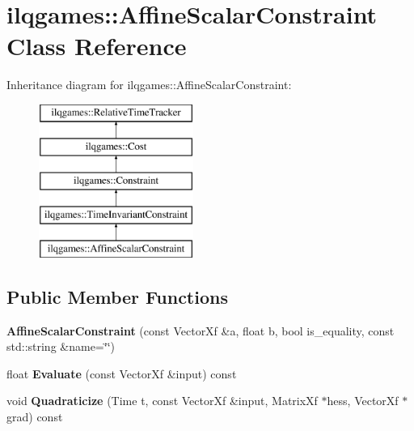 \hypertarget{classilqgames_1_1_affine_scalar_constraint}{}\section{ilqgames\+:\+:Affine\+Scalar\+Constraint Class Reference}
\label{classilqgames_1_1_affine_scalar_constraint}
Inheritance diagram for ilqgames\+:\+:Affine\+Scalar\+Constraint\+:\begin{figure}[H]
\begin{center}
\leavevmode
\includegraphics[height=5.000000cm]{classilqgames_1_1_affine_scalar_constraint}
\end{center}
\end{figure}
\subsection*{Public Member Functions}
\begin{DoxyCompactItemize}
\item 
{\bfseries Affine\+Scalar\+Constraint} (const Vector\+Xf \&a, float b, bool is\+\_\+equality, const std\+::string \&name=\char`\"{}\char`\"{})\hypertarget{classilqgames_1_1_affine_scalar_constraint_a450104ec20d507b10b9fff59b25a0120}{}\label{classilqgames_1_1_affine_scalar_constraint_a450104ec20d507b10b9fff59b25a0120}

\item 
float {\bfseries Evaluate} (const Vector\+Xf \&input) const \hypertarget{classilqgames_1_1_affine_scalar_constraint_af185f41cac2b73aa69145bcd1f1deaee}{}\label{classilqgames_1_1_affine_scalar_constraint_af185f41cac2b73aa69145bcd1f1deaee}

\item 
void {\bfseries Quadraticize} (Time t, const Vector\+Xf \&input, Matrix\+Xf $\ast$hess, Vector\+Xf $\ast$grad) const \hypertarget{classilqgames_1_1_affine_scalar_constraint_a985426b4931ec298b7c281611fa125f0}{}\label{classilqgames_1_1_affine_scalar_constraint_a985426b4931ec298b7c281611fa125f0}

\end{DoxyCompactItemize}
